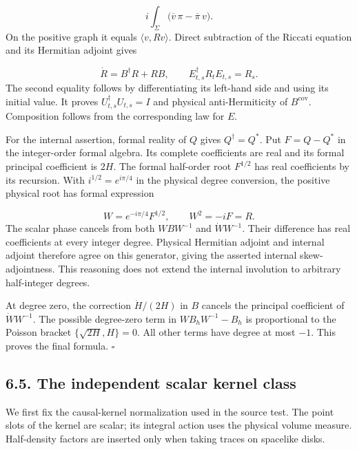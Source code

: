 \documentclass[
  english,
  11pt,
  reqno]{amsart}
\begin{document}
\label{eq:online-wave-klein-gordon-form} \[
i\int_\Sigma
\bigl(\overline v\,\pi-\overline\pi\,v\bigr).
\] On the positive graph it equals \(\langle v,Rv\rangle\). Direct
subtraction of the Riccati equation and its Hermitian adjoint gives

\label{eq:online-wave-charge-conservation} \[
\dot R=B^\dagger R+RB,
\qquad
E_{t,s}^\dagger R_tE_{t,s}=R_s.
\] The second equality follows by differentiating its left-hand side and
using its initial value. It proves \(U_{t,s}^\dagger U_{t,s}=I\) and
physical anti-Hermiticity of \(B^{\mathrm{cov}}\). Composition follows
from the corresponding law for \(E\).

For the internal assertion, formal reality of \(Q\) gives
\(Q^\dagger=Q^*\). Put \(F=Q-Q^*\) in the integer-order formal algebra.
Its complete coefficients are real and its formal principal coefficient
is \(2H\). The formal half-order root \(F^{1/2}\) has real coefficients
by its recursion. With \(i^{1/2}=e^{i\pi/4}\) in the physical degree
conversion, the positive physical root has formal expression

\label{eq:online-wave-charge-half-order-phase} \[
W=e^{-i\pi/4}F^{1/2},\qquad
W^2=-iF=R.
\] The scalar phase cancels from both \(WBW^{-1}\) and
\(\dot W W^{-1}\). Their difference has real coefficients at every
integer degree. Physical Hermitian adjoint and internal adjoint
therefore agree on this generator, giving the asserted internal
skew-adjointness. This reasoning does not extend the internal involution
to arbitrary half-integer degrees.

At degree zero, the correction \(\dot H/(2H)\) in \(B\) cancels the
principal coefficient of \(\dot W W^{-1}\). The possible degree-zero
term in \(WB_hW^{-1}-B_h\) is proportional to the Poisson bracket
\(\{\sqrt{2H},H\}=0\). All other terms have degree at most \(-1\). This
proves the final formula. \hfill\(\square\)

\subsection{6.5. The independent scalar kernel
class}\label{the-independent-scalar-kernel-class}\label{sec:online-wave-kernel-admission}

We first fix the causal-kernel normalization used in the source test.
The point slots of the kernel are scalar; its integral action uses the
physical volume measure. Half-density factors are inserted only when
taking traces on spacelike disks.
\end{document}
